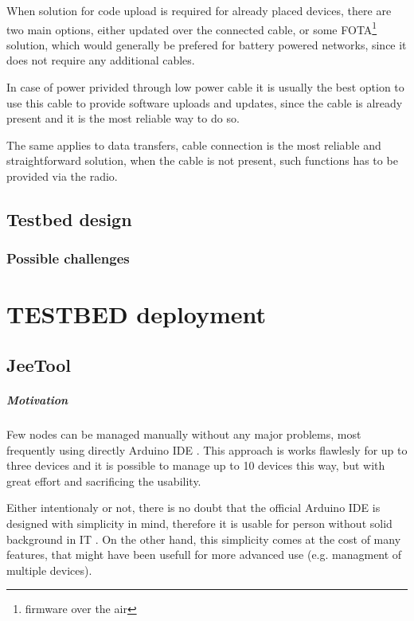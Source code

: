 \documentclass[
  digital, %
  table,   %
  nolof,     %
  nolot,     %
           oneside
]{fithesis3}
\begin{document}
  When solution for code upload is required for already placed devices, there are two main options, either updated over the connected cable, or some FOTA\footnote{firmware over the air} solution, which would generally be prefered for battery powered networks, since it does not require any additional cables.

  In case of power privided through low power cable it is usually the best option to use this cable to provide software uploads and updates, since the cable is already present and it is the most reliable way to do so.

  The same applies to data transfers, cable connection is the most reliable and straightforward solution, when the cable is not present, such functions has to be provided via the radio.

  \section{Testbed design}
  \subsection{Possible challenges}

\chapter{TESTBED deployment}

  \section{JeeTool} %
\paragraph{Motivation}
  Few nodes can be managed manually without any major problems, most frequently using directly Arduino IDE \cite{Arduino}.
  This approach is works flawlesly for up to three devices and it is possible to manage up to 10 devices this way, but with great effort and sacrificing the usability.

  Either intentionaly or not, there is no doubt that the official Arduino IDE is designed with simplicity in mind, therefore it is usable for person without solid background in IT \cite{ArduinoIntro}.
  On the other hand, this simplicity comes at the cost of many features, that might have been usefull for more advanced use (e.g. managment of multiple devices).
\end{document}

